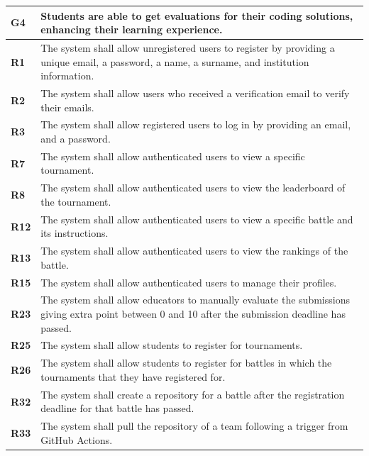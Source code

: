 \begin{table}[h!]
  \centering
  \begin{tabular}{lp{15cm}}
    \hline
    \textbf{G4} & Students are able to get evaluations for their coding solutions, enhancing their learning experience. \\
    \hline
    \hline
    \textbf{R1} & The system shall allow unregistered users to register by providing a unique email, a password, a name, a surname, and institution information. \\

    \textbf{R2} & The system shall allow users who received a verification email to verify their emails. \\

    \textbf{R3} & The system shall allow registered users to log in by providing an email, and a password. \\

    \textbf{R7} & The system shall allow authenticated users to view a specific tournament. \\

    \textbf{R8} & The system shall allow authenticated users to view the leaderboard of the tournament. \\

\textbf{R12} &  The system shall allow authenticated users to view a specific battle and its instructions.\\
\textbf{R13} &  The system shall allow authenticated users to view the rankings of the battle.\\

\textbf{R15} &  The system shall allow authenticated users to manage their profiles.\\

\textbf{R23} & The system shall allow educators to manually evaluate the submissions giving extra point between 0 and 10 after the submission deadline has passed.\\

\textbf{R25} &  The system shall allow students to register for tournaments.\\
\textbf{R26} &  The system shall allow students to register for battles in which the tournaments that they have registered for.\\

\textbf{R32} & The system shall create a repository for a battle after the registration deadline for that battle has passed.\\
\textbf{R33} & The system shall pull the repository of a team following a trigger from GitHub Actions.\\


\end{tabular}
\end{table}
